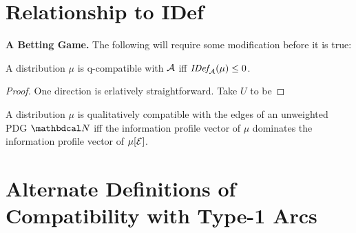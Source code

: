 \documentclass{article}
\begin{document}
\section{Relationship to IDef}

\textbf{A Betting Game.}
The following will require some modification before it is true:

\begin{conj}
    A distribution $\mu$ is q-compatible with $\mathcal A$
     iff $\mathit{IDef}_{\!\mathcal A}(\mu) \le 0$.
\end{conj}

\begin{proof}
    One direction is erlatively straightforward.
    Take $U$ to be 

    \TODO

\end{proof}




\begin{conj}
    A distribution $\mu$ is qualitatively compatible with the edges of an unweighted PDG $\dg N$ iff
    the information profile vector of $\mu$ dominates the information profile vector of $\mu[\mathcal E]$.
\end{conj}


\appendix
\clearpage
\section{Alternate Definitions of Compatibility with Type-1 Arcs}
\end{document}
